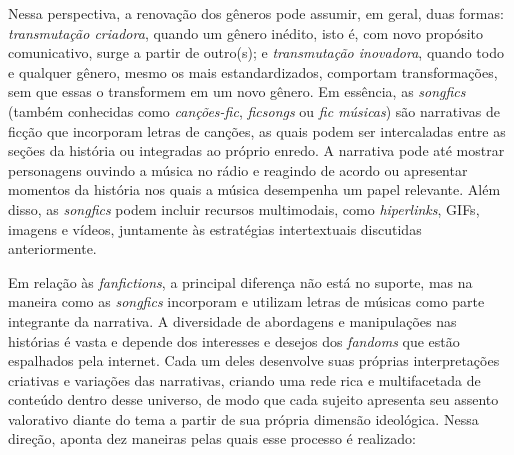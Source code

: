 Nessa perspectiva, a renovação dos gêneros pode assumir, em geral, duas
formas: \emph{transmutação criadora}, quando um gênero inédito, isto é,
com novo propósito comunicativo, surge a partir de outro(s); e
\emph{transmutação inovadora}, quando todo e qualquer gênero, mesmo os
mais estandardizados, comportam transformações, sem que essas o
transformem em um novo gênero. Em essência, as \emph{songfics} (também
conhecidas como \emph{canções-fic}, \emph{ficsongs} ou \emph{fic
músicas}) são narrativas de ficção que incorporam letras de canções, as
quais podem ser intercaladas entre as seções da história ou integradas
ao próprio enredo. A narrativa pode até mostrar personagens ouvindo a
música no rádio e reagindo de acordo ou apresentar momentos da história
nos quais a música desempenha um papel relevante. Além disso, as
\emph{songfics} podem incluir recursos multimodais, como
\emph{hiperlinks}, GIFs, imagens e vídeos, juntamente às estratégias
intertextuais discutidas anteriormente.

Em relação às \emph{fanfictions}, a principal diferença não está no
suporte, mas na maneira como as \emph{songfics} incorporam e utilizam
letras de músicas como parte integrante da narrativa. A diversidade de
abordagens e manipulações nas histórias é vasta e depende dos interesses
e desejos dos \emph{fandoms} que estão espalhados pela internet. Cada um
deles desenvolve suas próprias interpretações criativas e variações das
narrativas, criando uma rede rica e multifacetada de conteúdo dentro
desse universo, de modo que cada sujeito apresenta seu assento
valorativo diante do tema a partir de sua própria dimensão ideológica.
Nessa direção, \textcite{jenkins_textual_1992} aponta dez maneiras pelas quais esse
processo é realizado:

